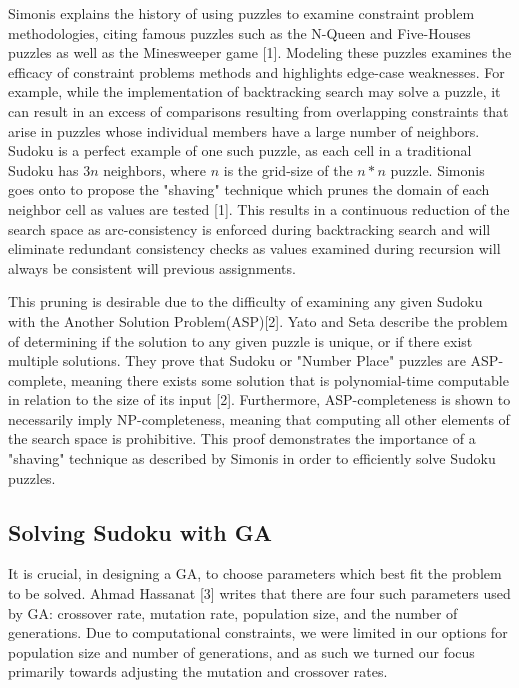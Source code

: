 \documentclass[12pt, conference]{IEEEtran}
\begin{document}
Simonis explains the history of using puzzles to examine constraint problem methodologies, citing famous puzzles such as the N-Queen and Five-Houses puzzles as well as the Minesweeper game [1].
Modeling these puzzles examines the efficacy of constraint problems methods and highlights edge-case weaknesses.
For example, while the implementation of backtracking search may solve a puzzle, it can result in an excess of comparisons resulting from overlapping constraints that arise in puzzles whose individual members have a large number of neighbors.
Sudoku is a perfect example of one such puzzle, as each cell in a traditional Sudoku has ${3n}$ neighbors, where ${n}$ is the grid-size of the ${n*n}$ puzzle.
Simonis goes onto to propose the "shaving" technique which prunes the domain of each neighbor cell as values are tested [1].
This results in a continuous reduction of the search space as arc-consistency is enforced during backtracking search and will eliminate redundant consistency checks as values examined during recursion will always be consistent will previous assignments.

\par
This pruning is desirable due to the difficulty of examining any given Sudoku with the Another Solution Problem(ASP)[2].
Yato and Seta describe the problem of determining if the solution to any given puzzle is unique, or if there exist multiple solutions.
They prove that Sudoku or "Number Place" puzzles are ASP-complete, meaning there exists some solution that is polynomial-time computable in relation to the size of its input [2].
Furthermore, ASP-completeness is shown to necessarily imply NP-completeness, meaning that computing all other elements of the search space is prohibitive.
This proof demonstrates the importance of a "shaving" technique as described by Simonis in order to efficiently solve Sudoku puzzles.

\subsection{Solving Sudoku with GA}

It is crucial, in designing a GA, to choose parameters which best fit the problem to be solved.
Ahmad Hassanat [3] writes that there are four such parameters used by GA: crossover rate, mutation rate, population size, and the number of generations.
Due to computational constraints, we were limited in our options for population size and number of generations, and as such we turned our focus primarily towards adjusting the mutation and crossover rates.
\end{document}
